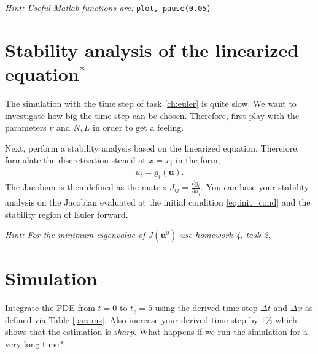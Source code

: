 \documentclass[a4paper,10pt]{article}
\begin{document}
\textit{Hint: Useful Matlab functions are: } \texttt{plot, pause(0.05) }
\section{Stability analysis of the linearized equation$^\ast$}
\label{eq:timestep}
The simulation with the time step of task \ref{ch:euler} is quite slow. We want to investigate how big the time step can be chosen. Therefore, first play with the parameters $\nu$ and $N,L$ in order to get a feeling.

Next, perform a stability analysis based on the linearized equation. Therefore, formulate the discretization stencil at $x=x_i$ in the form,
\begin{align*}
 \dot{u}_i = g_i(\mathbf{u}).
\end{align*}
The Jacobian is then defined as the matrix $J_{ij} = \frac{\partial g_i}{\partial u_j}$. You can base your stability analysis on the Jacobian evaluated at the initial condition \eqref{eq:init_cond} and the stability region of Euler forward.

\textit{Hint: For the minimum eigenvalue of $J(\mathbf{u}^0)$ use homework 4, task 2.}
\section{Simulation}
Integrate the PDE from $t=0$ to $t_e=5$ using the derived time step $\Delta t$ and $\Delta x$ as defined via Table \ref{params}. Also increase your derived time step by $1\%$ which shows that the estimation is \textit{sharp}. What happens if we run the simulation for a very long time?

% 
\end{document}
